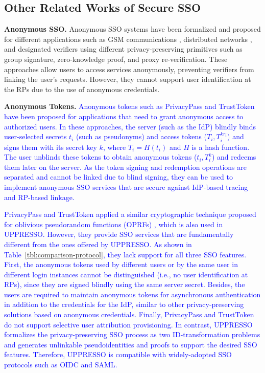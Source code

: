\subsection{Other Related Works of Secure SSO}
\label{sec:related}

\noindent\textbf{Anonymous SSO.} Anonymous SSO systems have been formalized \cite{WangWS13} and proposed for different applications such as GSM communications \cite{ElmuftiWRR08}, distributed networks \cite{WangWS13}, and designated verifiers \cite{HanCSTW18, HanCSTWW20} using different privacy-preserving primitives such as group signature, zero-knowledge proof, and proxy re-verification. These approaches allow users to access services anonymously, preventing verifiers from linking the user's requests. However, they cannot support user identification at the RPs due to the use of anonymous credentials.

%
\noindent\textbf{Anonymous Tokens.}
\textcolor{blue}{Anonymous tokens such as PrivacyPass and TrustToken \cite{privacypass, trusttoken} have been proposed for applications that need to grant anonymous access to authorized users. In these approaches, the server (such as the IdP) blindly binds user-selected secrets $t_i$ (such as pseudonyms) and access tokens ($T_i, T_i^{k{r_i}}$) and signs them with its secret key $k$, where $T_i=H(t_i)$ and $H$ is a hash function. The user unblinds these tokens to obtain anonymous tokens ($t_i, T_i^k$) and redeems them later on the server. As the token signing and redemption operations are separated and cannot be linked due to blind signing, they can be used to implement anonymous SSO services that are secure against IdP-based tracing and RP-based linkage.
}

\textcolor{blue}{PrivacyPass and TrustToken applied a similar cryptographic technique proposed for oblivious pseudorandom functions (OPRFs) \cite{oprf-proved}, which is also used in UPPRESSO. However, they provide SSO services that are fundamentally different from the ones offered by UPPRESSO. As shown in Table~\ref{tbl:comparison-protocol}, they lack support for all three SSO features. First, the anonymous tokens used by different users or by the same user in different login instances cannot be distinguished (i.e., no user identification at RPs), since they are signed blindly using the same server secret. Besides, the users are required to maintain anonymous tokens for asynchronous authentication in addition to the credentials for the IdP, similar to other privacy-preserving solutions based on anonymous credentials. Finally, PrivacyPass and TrustToken do not support selective user attribution provisioning. In contrast, UPPRESSO formalizes the privacy-preserving SSO process as two ID-transformation problems and generates unlinkable pseudoidentities and proofs to support the desired SSO features. Therefore,  UPPRESSO is  compatible with widely-adopted SSO protocols such as OIDC and SAML.
}

